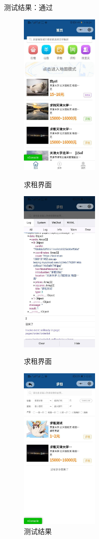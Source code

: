 测试结果：通过
\begin{figure}[htbp]
    \centering
    \begin{minipage}[t]{0.32\textwidth}
        \centering
        \includegraphics[width=3.8cm,height=8cm]{test/image/test13.png} 
       \caption{求租界面} 
        \end{minipage}
    \begin{minipage}[t]{0.32\textwidth}
    \centering
    \includegraphics[width=3.8cm,height=8cm]{test/image/test14.png} 
   \caption{求租界面} 
    \end{minipage}
    \begin{minipage}[t]{0.32\textwidth}
    \centering
    \includegraphics[width=3.8cm,height=8cm]{test/image/test15.png}
    \caption{测试结果}
    \end{minipage}
    \end{figure}
  
